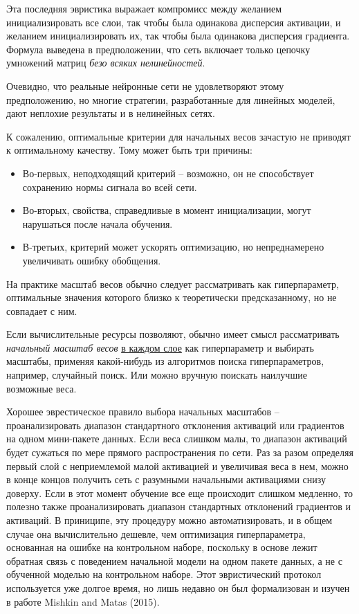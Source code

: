 \documentclass[%
	11pt,
	a4paper,
	utf8,
]{article}
\begin{document}
Эта последняя эвристика выражает компромисс между желанием инициализировать все слои, так чтобы была одинакова дисперсия активации, и желанием инициализировать их, так чтобы была одинакова дисперсия градиента. Формула выведена в предположении, что сеть включает только цепочку умножений матриц \emph{безо всяких нелинейностей}.

Очевидно, что реальные нейронные сети не удовлетворяют этому предположению, но многие стратегии, разработанные для линейных моделей, дают неплохие результаты и в нелинейных сетях.

К сожалению, оптимальные критерии для начальных весов зачастую не приводят к оптимальному качеству. Тому может быть три причины:
\begin{itemize}
	\item Во-первых, неподходящий критерий -- возможно, он не способствует сохранению нормы сигнала во всей сети.
	
	\item Во-вторых, свойства, справедливые в момент инициализации, могут нарушаться после начала обучения.
	
	\item В-третьих, критерий может ускорять оптимизацию, но непреднамерено увеличивать ошибку обобщения.
\end{itemize}

На практике масштаб весов обычно следует рассматривать как гиперпараметр, оптимальные значения которого близко к теоретически предсказанному, но не совпадает с ним.

Если вычислительные ресурсы позволяют, обычно имеет смысл рассматривать \emph{начальный масштаб весов} \underline{в каждом слое} как гиперпараметр и выбирать масштабы, применяя какой-нибудь из алгоритмов поиска гиперпараметров, например, случайный поиск. Или можно вручную поискать наилучшие возможные веса.

Хорошее эврестическое правило выбора начальных масштабов -- проанализировать диапазон стандартного отклонения активаций или градиентов на одном мини-пакете данных. Если веса слишком малы, то диапазон активаций будет сужаться по мере прямого распространения по сети. Раз за разом определяя первый слой с неприемлемой малой активацией и увеличивая веса в нем, можно в конце концов получить сеть с разумными начальными активациями снизу доверху. Если в этот момент обучение все еще происходит слишком медленно, то полезно также проанализировать диапазон стандартных отклонений градиентов и активаций. В приниципе, эту процедуру можно автоматизировать, и в общем случае она вычислительно дешевле, чем оптимизация гиперпараметра, основанная на ошибке на контрольном наборе, поскольку в основе лежит обратная связь с поведением начальной модели на одном пакете данных, а не с обученной моделью на контрольном наборе. Этот эвристический протокол используется уже долгое время, но лишь недавно он был формализован и изучен в работе Mishkin and Matas (2015).
\end{document}
